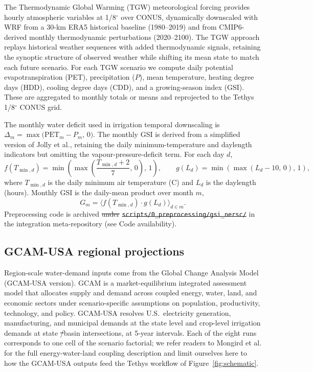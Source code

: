 \documentclass[fleqn,10pt]{wlscirep}
\providecommand{\DIFadd}[1]{{\protect\color{blue}\uwave{#1}}} %
\providecommand{\DIFdel}[1]{{\protect\color{red}\sout{#1}}} %
\providecommand{\DIFaddbegin}{} %
\providecommand{\DIFaddend}{} %
\providecommand{\DIFdelbegin}{} %
\providecommand{\DIFdelend}{} %
\begin{document}
The Thermodynamic Global Warming (TGW) meteorological forcing\cite{Jones2023TGW} provides hourly atmospheric variables at 1/8$^{\circ}$ over CONUS, dynamically downscaled with WRF from a 30-km ERA5 historical baseline (1980--2019) and from CMIP6-derived monthly thermodynamic perturbations (2020--2100). The TGW approach replays historical weather sequences with added thermodynamic signals, retaining the synoptic structure of observed weather while shifting its mean state to match each future scenario. For each TGW scenario we compute daily potential evapotranspiration (PET), precipitation ($P$), mean temperature, heating degree days (HDD), cooling degree days (CDD), and a growing-season index (GSI). These are aggregated to monthly totals or means and reprojected to the Tethys 1/8$^{\circ}$ CONUS grid.

The monthly water deficit used in irrigation temporal downscaling is $\Delta_m = \max\!\big(\text{PET}_m - P_m,\, 0\big)$. The monthly GSI is derived from a simplified version of Jolly et al.\cite{Jolly_2005}, retaining the daily minimum-temperature and daylength indicators but omitting the vapour-pressure-deficit term. For each day $d$,
\begin{equation}
f(T_{\min,d}) = \min\!\left(\max\!\left(\frac{T_{\min,d}+2}{7},\,0\right),\,1\right), \qquad
g(L_d) = \min\!\left(\max\!\left(L_d - 10,\,0\right),\,1\right),
\label{eq:gsi-components}
\end{equation}
where $T_{\min,d}$ is the daily minimum air temperature (\textdegree C) and $L_d$ is the daylength (hours). Monthly GSI is the daily-mean product over month $m$,
\begin{equation}
G_m = \big\langle f(T_{\min,d}) \cdot g(L_d) \big\rangle_{d \in m}.
\label{eq:gsi-monthly}
\end{equation}
Preprocessing code is archived \DIFdelbegin \DIFdel{under }\texttt{\DIFdel{scripts/0\_preprocessing/gsi\_nersc/}} %
\DIFdelend in the integration meta-repository (see Code availability).

\subsection*{GCAM-USA regional projections}

Region-scale water-demand inputs come from the Global Change Analysis Model (GCAM-USA version)\cite{Zhao_gcamusa_water,Zhao2024,Calvin2019GCAM,Binsted_2022}. GCAM is a market-equilibrium integrated assessment model that allocates supply and demand across coupled energy, water, land, and economic sectors under scenario-specific assumptions on population, productivity, technology, and policy. GCAM-USA resolves U.S.\ electricity generation, manufacturing, and municipal demands at the state level and crop-level irrigation demands at state \DIFdelbegin \DIFdel{/}\DIFdelend \DIFaddbegin \DIFadd{$\times$ }\DIFaddend basin intersections, at 5-year intervals. Each of the eight runs corresponds to one cell of the scenario factorial; we refer readers to Mongird et al.\cite{Mongird2025CERF} for the full energy-water-land coupling description and limit ourselves here to how the GCAM-USA outputs feed the Tethys workflow of Figure~\ref{fig:schematic}.
\end{document}
